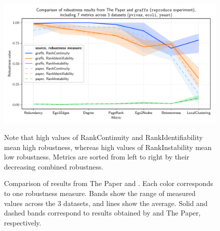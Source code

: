 \begin{figure}
    \includegraphics[width=\linewidth]{plot_reproduction.pdf}
    \vspace*{-0.6cm}
    \caption{Comparison of results from The Paper and \graffs.
    Each color corresponds to one robustness measure.
    Bands show the range of measured values across the 3 datasets, and lines show the average.
    Solid and dashed bands correspond to results obtained by \graffs and The Paper, respectively.}
    \label{fig:plot_reproduction}
    \footnotesize\justify\vspace{-0.4\baselineskip}
    Note that high values of RankContinuity and RankIdentifiability mean high robustness, whereas high values of RankInstability mean low robustness.
    Metrics are sorted from left to right by their decreasing combined robustness.
\end{figure}
